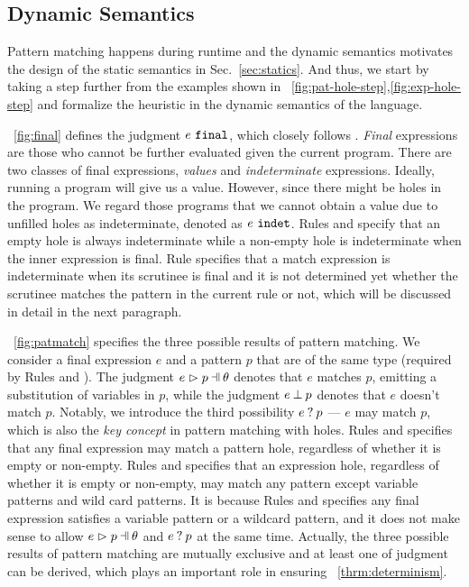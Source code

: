 \documentclass[runningheads,envcountsame,a4paper]{llncs}
\begin{document}
\subsection{Dynamic Semantics}\label{sec:dynamics}
Pattern matching happens during runtime and the dynamic semantics motivates the
design of the static semantics in Sec.~\ref{sec:statics}. And thus, we start by
taking a step further from the examples shown in
\listfigurename~\ref{fig:pat-hole-step},\ref{fig:exp-hole-step} and formalize
the heuristic in the dynamic semantics of the language.


\figurename~\ref{fig:final} defines the judgment $e ~\mathtt{final}$, which closely
follows \cite{DBLP:journals/pacmpl/OmarVCH19}. \textit{Final} expressions are
those who cannot be further evaluated given the current program. There are two
classes of final expressions, \textit{values} and \textit{indeterminate}
expressions. Ideally, running a program will give us a value. However, since
there might be holes in the program. We regard those programs that we cannot
obtain a value due to unfilled holes as indeterminate, denoted as
$e ~\mathtt{indet}$. Rules \IEHole and \IHole specify that an empty hole is always
indeterminate while a non-empty hole is indeterminate when the inner expression
is final. Rule \IMatch specifies that a match expression is indeterminate when
its scrutinee is final and it is not determined yet whether the scrutinee
matches the pattern in the current rule or not, which will be discussed in
detail in the next paragraph.

 \figurename~\ref{fig:patmatch} specifies the three
possible results of pattern matching. We consider a final expression $e$ and a
pattern $p$ that are of the same type (required by Rules \TMatchZPre and
\TMatchNZPre). The judgment $\hpatmatch{e}{p}{\theta}$ denotes that $e$ matches
$p$, emitting a substitution of variables in $p$, while the judgment
$e \mathbin{\bot} p$ denotes that $e$ doesn't match $p$. Notably, we introduce
the third possibility $e \mathbin{?} p$ --- $e$ may match $p$, which is also
the \textit{key concept} in pattern matching with holes. Rules \MMEHole and
\MMHole specifies that any final expression may match a pattern hole,
regardless of whether it is empty or non-empty. Rules \MMExpEHole and
\MMExpHole specifies that an expression hole, regardless of whether it is empty
or non-empty, may match any pattern except variable patterns and wild card
patterns. It is because Rules \MVar and \MWild specifies any final expression
satisfies a variable pattern or a wildcard pattern, and it does not make sense
to allow $\hpatmatch{e}{p}{\theta}$ and $e \mathbin{?} p$ at the same time.
Actually, the three possible results of pattern matching are mutually exclusive
and at least one of judgment can be derived, which plays an important role in
ensuring \theoremname~\ref{thrm:determinism}.
\end{document}
